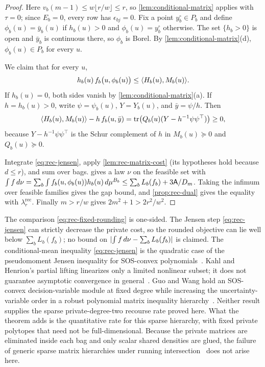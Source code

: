 \begin{proof}
Here $v_b(m-1)\le w\lfloor r/w\rfloor\le r$, so \cref{lem:conditional-matrix}
applies with $\tau=0$; since $E_b=0$, every row has $\epsilon_{bj}=0$. Fix a
point $y_b^\circ\in P_b$ and define $\phi_b(u)=\bar y_b(u)$ if $h_b(u)>0$ and
$\phi_b(u)=y_b^\circ$ otherwise. The set $\{h_b>0\}$ is open and $\bar y_b$
is continuous there, so $\phi_b$ is Borel. By
\cref{lem:conditional-matrix}(d), $\phi_b(u)\in P_b$ for every $u$.

We claim that for every $u$,
\begin{equation}\label{eq:rec-jensen}
  h_b(u)\,f_b\bigl(u,\phi_b(u)\bigr)\le\langle H_b(u),M_b(u)\rangle .
\end{equation}
If $h_b(u)=0$, both sides vanish by \cref{lem:conditional-matrix}(a). If
$h=h_b(u)>0$, write $\psi=\psi_b(u)$, $Y=Y_b(u)$, and $\bar y=\psi/h$. Then
\[
  \langle H_b(u),M_b(u)\rangle-h\,f_b(u,\bar y)
  =\operatorname{tr}\bigl(Q_b(u)(Y-h^{-1}\psi\psi^\top)\bigr)\ge0,
\]
because $Y-h^{-1}\psi\psi^\top$ is the Schur complement of $h$ in
$M_b(u)\succeq0$ and $Q_b(u)\succeq0$.

Integrate \eqref{eq:rec-jensen}, apply \cref{lem:rec-matrix-cost} (its
hypotheses hold because $d\le r$), and sum over bags. 
gives a law $\nu$ on the feasible set with
$\int f\,d\nu=\sum_b\int f_b(u,\phi_b(u))h_b(u)\,d\mu^{B_b}\le
\sum_bL_b(f_b)+3\mathsf{A}/D_m$. Taking the infimum over feasible families gives
the gap bound, and \cref{prop:rec-dual} gives the equality with
$\lambda^{\mathrm{rec}}_r$. Finally $m>r/w$ gives $2m^2+1>2r^2/w^2$.
\end{proof}

The comparison \eqref{eq:rec-fixed-rounding} is one-sided. The Jensen
step \eqref{eq:rec-jensen} can strictly decrease the private cost, so the
rounded objective can lie well below $\sum_bL_b(f_b)$; no bound on
$\lvert \int f\,d\nu-\sum_bL_b(f_b)\rvert$ is claimed. The conditional-mean inequality
\eqref{eq:rec-jensen} is the quadratic case of the pseudomoment Jensen
inequality for SOS-convex polynomials~\cite{lasserre2009-convexity-sdp}.
Kahl and Henrion's partial lifting linearizes only a limited nonlinear
subset; it does not guarantee asymptotic convergence in
general~\cite{kahl2005-globally-optimal-estimates}.
Guo and Wang hold an SOS-convex decision-variable module at fixed degree
while increasing the uncertainty-variable order in a robust polynomial
matrix inequality hierarchy~\cite{wang2025-a-moment-sum-of-squares}.
Neither result supplies the sparse private-degree-two recourse rate proved here.
What the theorem adds is the quantitative rate for this sparse hierarchy,
with fixed private polytopes that need not be full-dimensional. Because the
private matrices are eliminated inside each bag and only scalar shared
densities are glued, the failure of generic sparse matrix hierarchies under
running intersection~\cite{miller2025-sparse-matrix} does not arise here.

